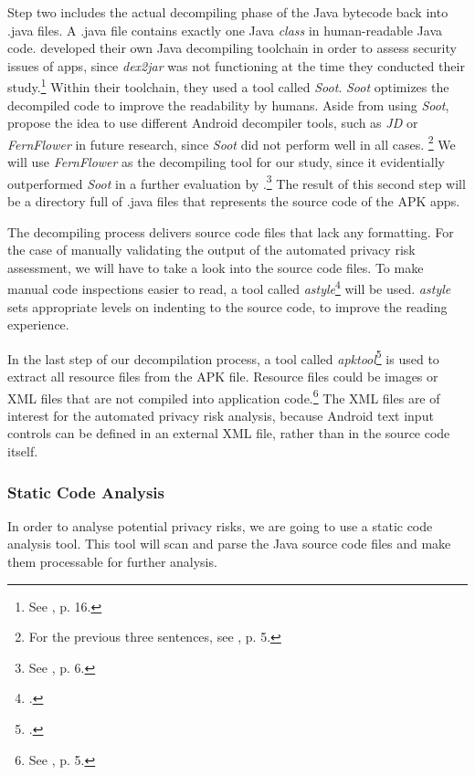 \documentclass[
	a4paper,
	oneside,
	12pt,
	liststotocnumbered
]{article}
\let\cite\textcite
\begin{document}
Step two includes the actual decompiling phase of the Java bytecode back into .java files. 
A .java file contains exactly one Java \textit{class} in human-readable Java code. 
\cite{Enck2011} developed their own Java decompiling toolchain in order to assess security issues of \mH apps, since \textit{dex2jar} was not functioning at the time they conducted their study.\footnote{See \cite{Enck2011}, p. 16.}
Within their toolchain, they used a tool called \textit{Soot}.
\textit{Soot} optimizes the decompiled code to improve the readability by humans.
Aside from using \textit{Soot}, \cite{Enck2011} propose the idea to use different Android decompiler tools, such as \textit{JD} or \textit{FernFlower} in future research, since \textit{Soot} did not perform well in all cases. \footnote{For the previous three sentences, see \cite{Enck2011}, p. 5.}
We will use \textit{FernFlower} as the decompiling tool for our study, since it evidentially outperformed \textit{Soot} in a further evaluation by \cite{Enck2011}.\footnote{See \cite{Enck2011}, p. 6.}
The result of this second step will be a directory full of .java files that represents the source code of the \acs{APK} apps.

The decompiling process delivers source code files that lack any formatting.
For the case of manually validating the output of the automated privacy risk assessment, we will have to take a look into the source code files. 
To make manual code inspections easier to read, a tool called \textit{astyle}\footnote{\cite{Davidson2006}.} will be used. 
\textit{astyle} sets appropriate levels on indenting to the source code, to improve the reading experience.

In the last step of our decompilation process, a tool called \textit{apktool}\footnote{\cite{Tumbleson2010}.} is used to extract all resource files from the \acs{APK} file. Resource files could be images or XML files that are not compiled into application code.\footnote{See \cite{xu2013}, p. 5.}
The XML files are of interest for the automated privacy risk analysis, because Android text input controls can be defined in an external XML file, rather than in the source code itself.

\subsubsection{Static Code Analysis}
In order to analyse potential privacy risks, we are going to use a static code analysis tool.
This tool will scan and parse the Java source code files and make them processable for further analysis.
\end{document}

